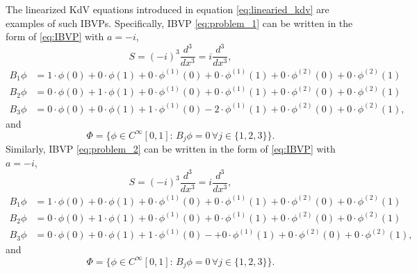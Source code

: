 \documentclass[11pt, oneside, a4paper]{article}
\begin{document}
The linearized KdV equations introduced in equation \eqref{eq:linearied_kdv} are examples of such IBVPs. Specifically, IBVP \eqref{eq:problem_1} can be written in the form of \eqref{eq:IBVP} with $a=-i$,
\[S = (-i)^3 \frac{d^3}{dx^3} = i\frac{d^3}{dx^3},\]
\begin{align*}
    B_1 \phi &= 1\cdot\phi(0) + 0\cdot\phi(1) + 0\cdot\phi^{(1)}(0) + 0\cdot\phi^{(1)}(1) + 0\cdot\phi^{(2)}(0) + 0\cdot\phi^{(2)}(1)\\
    B_2 \phi &= 0\cdot\phi(0) + 1\cdot\phi(1) + 0\cdot\phi^{(1)}(0) + 0\cdot\phi^{(1)}(1) + 0\cdot\phi^{(2)}(0) + 0\cdot\phi^{(2)}(1)\\
    B_3 \phi &= 0\cdot\phi(0) + 0\cdot\phi(1) + 1\cdot\phi^{(1)}(0) - 2\cdot\phi^{(1)}(1) + 0\cdot\phi^{(2)}(0) + 0\cdot\phi^{(2)}(1),
\end{align*}
and 
\[\Phi = \{\phi\in C^{\infty}[0,1]:\, B_j\phi = 0\,\forall j\in\{1,2,3\}\}.\]
Similarly, IBVP \eqref{eq:problem_2} can be written in the form of \eqref{eq:IBVP} with $a=-i$,
\[S = (-i)^3 \frac{d^3}{dx^3} = i\frac{d^3}{dx^3},\]
\begin{align*}
    B_1 \phi &= 1\cdot\phi(0) + 0\cdot\phi(1) + 0\cdot\phi^{(1)}(0) + 0\cdot\phi^{(1)}(1) + 0\cdot\phi^{(2)}(0) + 0\cdot\phi^{(2)}(1)\\
    B_2 \phi &= 0\cdot\phi(0) + 1\cdot\phi(1) + 0\cdot\phi^{(1)}(0) + 0\cdot\phi^{(1)}(1) + 0\cdot\phi^{(2)}(0) + 0\cdot\phi^{(2)}(1)\\
    B_3 \phi &= 0\cdot\phi(0) + 0\cdot\phi(1) + 1\cdot\phi^{(1)}(0) -+ 0\cdot\phi^{(1)}(1) + 0\cdot\phi^{(2)}(0) + 0\cdot\phi^{(2)}(1),
\end{align*}
and 
\[\Phi = \{\phi\in C^{\infty}[0,1]:\, B_j\phi = 0\,\forall j\in\{1,2,3\}\}.\]

\end{document}
